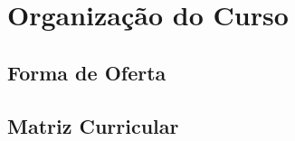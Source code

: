 \documentclass[11pt,fleqn]{book} %
\begin{document}
\chapter{Organização do Curso}
\vspace{12em}

\section{Forma de Oferta}\label{carga}


\section{Matriz Curricular}\label{matriz}

\end{document}
